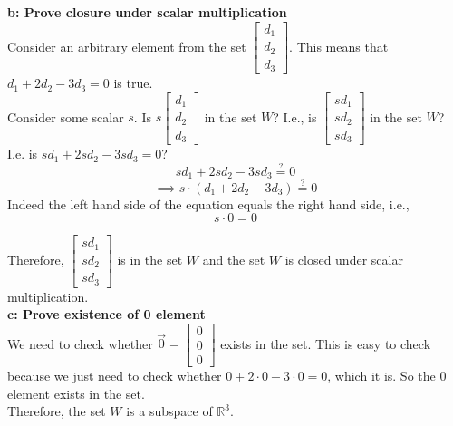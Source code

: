 \begin{enumerate}
{    \textbf{b: Prove closure under scalar multiplication} \\
    Consider an arbitrary element from the set $\begin{bmatrix} d_1 \\ d_2 \\ d_3 \end{bmatrix}$. This means that $d_1 + 2d_2 - 3d_3 = 0$ is true. \\
    Consider some scalar $s$. Is $s\begin{bmatrix} d_1 \\ d_2 \\ d_3 \end{bmatrix}$ in the set $W$? I.e., is $\begin{bmatrix} sd_1 \\ sd_2 \\ sd_3 \end{bmatrix}$ in the set $W$? I.e. is $sd_1 + 2sd_2 - 3sd_3 = 0$?
    $$sd_1 + 2sd_2 - 3sd_3 \stackrel{?}{=} 0$$
    $$\implies s \cdot (d_1 + 2d_2 - 3d_3) \stackrel{?}{=} 0$$
    Indeed the left hand side of the equation equals the right hand side, i.e., $$s\cdot 0 = 0$$

    Therefore, $\begin{bmatrix} sd_1 \\ sd_2 \\ sd_3 \end{bmatrix}$ is in the set $W$ and the set $W$ is closed under scalar multiplication. \\ 

    \textbf{c: Prove existence of 0 element} \\
    We need to check whether $\vec{0} = \begin{bmatrix} 0 \\ 0 \\ 0 \end{bmatrix}$ exists in the set. This is easy to check because we just need to check whether $0 + 2 \cdot 0 - 3 \cdot 0 = 0$, which it is. So the 0 element exists in the set. \\ 

    Therefore, the set $W$ is a subspace of $\mathbb{R}^3$. 
}



\end{enumerate}
